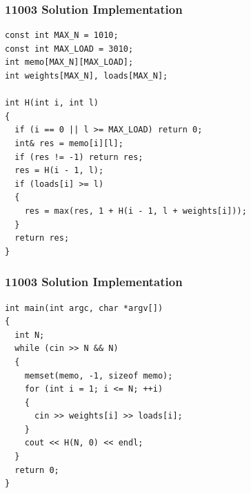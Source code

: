 \documentclass{beamer}
\begin{document}
\begin{frame}[containsverbatim]
\frametitle{11003 Solution Implementation}
\scriptsize

\begin{lstlisting}
const int MAX_N = 1010;
const int MAX_LOAD = 3010;
int memo[MAX_N][MAX_LOAD];
int weights[MAX_N], loads[MAX_N];

int H(int i, int l)
{
  if (i == 0 || l >= MAX_LOAD) return 0;
  int& res = memo[i][l];
  if (res != -1) return res;
  res = H(i - 1, l);
  if (loads[i] >= l)
  {
    res = max(res, 1 + H(i - 1, l + weights[i]));
  }
  return res;
}
\end{lstlisting}

\end{frame}

\begin{frame}[containsverbatim]
\frametitle{11003 Solution Implementation}
\scriptsize

\begin{lstlisting}
int main(int argc, char *argv[])
{
  int N;
  while (cin >> N && N)
  {
    memset(memo, -1, sizeof memo);
    for (int i = 1; i <= N; ++i)
    {
      cin >> weights[i] >> loads[i];
    }
    cout << H(N, 0) << endl;
  }
  return 0;
}
\end{lstlisting}

\end{frame}
\end{document}
